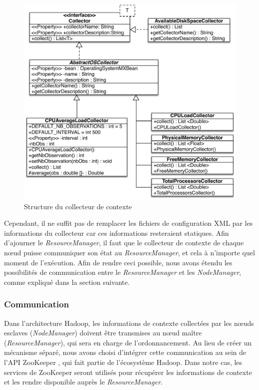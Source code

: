 \begin{figure}[!ht]
	\centering
	\includegraphics[width=0.75\linewidth]{img/CollectorUML2.pdf}
	\caption{Structure du collecteur de contexte}
	\label{fig:CollectorDiag}
\end{figure}

Cependant, il ne suffit pas de remplacer les fichiers de configuration XML par les informations du collecteur car ces informations resteraient statiques. Afin d'ajourner le \textit{ResourceManager}, il faut que le collecteur de contexte de chaque n{\oe}ud puisse communiquer son état au \textit{ResourceManager}, et cela à n'importe quel moment de l'exécution. Afin de rendre ceci possible, nous avons étendu les possibilités de communication entre le \textit{ResourceManager} et les \textit{NodeManager}, comme expliqué dans la section suivante.    

\subsubsection{Communication}
Dans l'architecture Hadoop, les informations de contexte collectées par les n{\oe}uds esclaves (\textit{NodeManager}) doivent être transmises au n{\oe}ud maître (\textit{ResourceManager}), qui sera en charge de l'ordonnancement. Au lieu de créer un mécanisme séparé, nous avons choisi d'intégrer cette communication au sein de l'API ZooKeeper \cite{Hunt2010}, qui fait partie de l'écosystème Hadoop. Dans notre cas, les services de ZooKeeper seront utilisés pour récupérer les informations de contexte et les rendre disponible auprès le \textit{ResourceManager}. 

